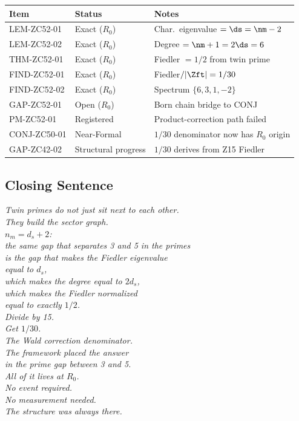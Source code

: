 \documentclass[12pt, a4paper]{article}
\begin{document}
\begin{center}
\begin{tabular}{@{}lp{4cm}p{5cm}@{}}
\toprule
\textbf{Item} & \textbf{Status} & \textbf{Notes} \\
\midrule
LEM-ZC52-01 & Exact ($R_0$) & Char.\ eigenvalue $=\ds=\nm-2$ \\
LEM-ZC52-02 & Exact ($R_0$) & Degree $=\nm+1=2\ds=6$ \\
THM-ZC52-01 & Exact ($R_0$) & Fiedler $=1/2$ from twin prime \\
FIND-ZC52-01 & Exact ($R_0$) & Fiedler$/|\Zft|=1/30$ \\
FIND-ZC52-02 & Exact ($R_0$) & Spectrum $\{6,3,1,-2\}$ \\
GAP-ZC52-01 & Open ($R_0$) & Born chain bridge to CONJ \\
PM-ZC52-01 & Registered & Product-correction path failed \\
\midrule
CONJ-ZC50-01 & Near-Formal & $1/30$ denominator now has $R_0$ origin \\
GAP-ZC42-02 & Structural progress & $1/30$ derives from Z15 Fiedler \\
\bottomrule
\end{tabular}
\end{center}

\subsection{Closing Sentence}

\begin{center}
\textit{%
Twin primes do not just sit next to each other.\\
They build the sector graph.\\[0.3em]
$n_m = d_s + 2$:\\
the same gap that separates 3 and 5 in the primes\\
is the gap that makes the Fiedler eigenvalue\\
equal to $d_s$,\\
which makes the degree equal to $2d_s$,\\
which makes the Fiedler normalized\\
equal to exactly $1/2$.\\[0.3em]
Divide by 15.\\
Get $1/30$.\\
The Wald correction denominator.\\[0.3em]
The framework placed the answer\\
in the prime gap between 3 and 5.\\
All of it lives at $R_0$.\\
No event required.\\
No measurement needed.\\
The structure was always there.}
\end{center}
\end{document}
